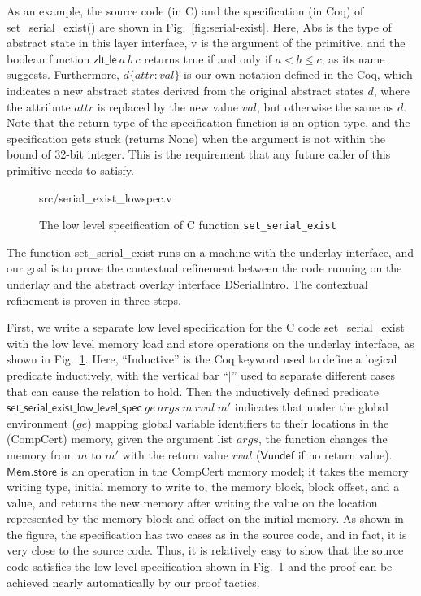 As an example, the source code (in C) and the specification (in Coq) of
\textsf{set\_serial\_exist()} are shown in Fig.~\ref{fig:serial-exist}.
Here, \textsf{Abs} is the type of abstract state in this layer interface,
\textsf{v} is the argument of the primitive, and the boolean function
$\textsf{zlt\_le}~a~b~c$ returns true if and only if $a< b\le c$, as
its name suggests. Furthermore, $d\{attr:val\}$ is our own notation
defined in the Coq, which indicates a new abstract states derived
from the original abstract states $d$, where the attribute $attr$ is
replaced by the new value $val$, but otherwise the same as $d$.
Note that the return type of the
specification function is an option type, and the specification gets stuck
(returns \textsf{None}) when the argument is not within the bound of 32-bit
integer. This is the requirement that any future caller of this primitive needs
to satisfy.

\begin{figure}
	 {src/serial_exist_lowspec.v}
	\caption{The low level specification of C function \texttt{set\_serial\_exist}}
	\label{fig:serial-exist-lowspec}
\end{figure}
 
The function \textsf{set\_serial\_exist} runs on a machine with the
underlay interface, and our goal is to prove the contextual refinement between
the code running on the underlay and the abstract overlay interface
DSerialIntro. The contextual refinement is proven in three steps.

First, we write a separate low level specification for the C code
\textsf{set\_serial\_exist} with the low level memory load and store operations
on the underlay interface, as shown in Fig.~\ref{fig:serial-exist-lowspec}.
Here, ``Inductive'' is the Coq keyword used to define a logical predicate
inductively, with the vertical bar ``$|$'' used to separate different cases
that can cause the relation to hold.
Then the inductively defined predicate
$\textsf{set\_serial\_exist\_low\_level\_spec}~ ge~ args~ m~ rval~ m'$
indicates that under the global environment ($ge$) mapping global variable
identifiers to their locations in the (CompCert) memory, given the argument list
$args$, the function changes the memory from $m$ to $m'$ with the return value
$rval$ ($\textsf{Vundef}$ if no return value). $\textsf{Mem.store}$ is an
operation in the CompCert memory model;  it takes the memory writing type, initial
memory to write to, the memory block, block offset, and a value, and returns the
new memory after writing the value on the location represented by the memory
block and offset on the initial memory. As shown in the figure, the
specification has two cases as in the source code, and in fact, it is very close
to the source code. Thus, it is relatively easy to show that the source code
satisfies the low level specification shown in
Fig.~\ref{fig:serial-exist-lowspec} and the proof can be achieved nearly
automatically by our proof tactics.

